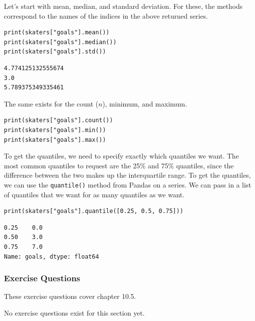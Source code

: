 Let's start with mean, median, and standard deviation. For these, the methods correspond to the names of the indices in the above returned series.\par
\begin{lstlisting}[style=pippython]
print(skaters["goals"].mean())
print(skaters["goals"].median())
print(skaters["goals"].std())
\end{lstlisting}
\begin{lstlisting}[style=none]
4.774125132555674
3.0
5.789375349335461
\end{lstlisting}
The same exists for the count ($n$), minimum, and maximum.\par
\begin{lstlisting}[style=pippython]
print(skaters["goals"].count())
print(skaters["goals"].min())
print(skaters["goals"].max())
\end{lstlisting}
To get the quantiles, we need to specify exactly which quantiles we want. The most common quantiles to request are the 25\% and 75\% quantiles, since the difference between the two makes up the interquartile range. To get the quantiles, we can use the \verb|quantile()| method from Pandas on a series. We can pass in a list of quantiles that we want for as many quantiles as we want.\par
\begin{lstlisting}[style=pippython]
print(skaters["goals"].quantile([0.25, 0.5, 0.75]))
\end{lstlisting}
\begin{lstlisting}[style=none]
0.25    0.0
0.50    3.0
0.75    7.0
Name: goals, dtype: float64
\end{lstlisting}

\subsubsection*{Exercise Questions}
These exercise questions cover chapter 10.5.

No exercise questions exist for this section yet.


